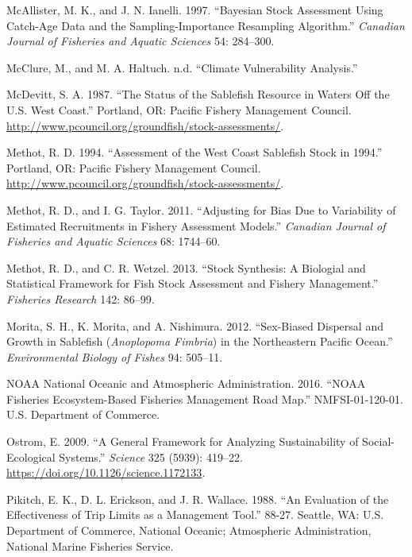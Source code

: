 \documentclass[11pt,
  english,
  a4paper,
]{article}
\newlength{\cslhangindent}
\newenvironment{cslreferences}%
  {\setlength{\parindent}{0pt}%
  \everypar{\setlength{\hangindent}{\cslhangindent}}\ignorespaces}%
  {\par}
\begin{document}
\begin{cslreferences}
\leavevmode\hypertarget{ref-McAllisterIanelli1997}{}%
McAllister, M. K., and J. N. Ianelli. 1997. ``Bayesian Stock Assessment Using Catch-Age Data and the Sampling-Importance Resampling Algorithm.'' \emph{Canadian Journal of Fisheries and Aquatic Sciences} 54: 284--300.

\leavevmode\hypertarget{ref-mcclure2020}{}%
McClure, M., and M. A. Haltuch. n.d. ``Climate Vulnerability Analysis.''

\leavevmode\hypertarget{ref-mcdevitt1987sablefish}{}%
McDevitt, S. A. 1987. ``The Status of the Sablefish Resource in Waters Off the U.S. West Coast.'' Portland, OR: Pacific Fishery Management Council. \url{http://www.pcouncil.org/groundfish/stock-assessments/}.

\leavevmode\hypertarget{ref-methot1994}{}%
Methot, R. D. 1994. ``Assessment of the West Coast Sablefish Stock in 1994.'' Portland, OR: Pacific Fishery Management Council. \url{http://www.pcouncil.org/groundfish/stock-assessments/}.

\leavevmode\hypertarget{ref-MethotTaylor2011}{}%
Methot, R. D., and I. G. Taylor. 2011. ``Adjusting for Bias Due to Variability of Estimated Recruitments in Fishery Assessment Models.'' \emph{Canadian Journal of Fisheries and Aquatic Sciences} 68: 1744--60.

\leavevmode\hypertarget{ref-MethotWetzel2013}{}%
Methot, R. D., and C. R. Wetzel. 2013. ``Stock Synthesis: A Biologial and Statistical Framework for Fish Stock Assessment and Fishery Management.'' \emph{Fisheries Research} 142: 86--99.

\leavevmode\hypertarget{ref-morita2012envbiofishsex}{}%
Morita, S. H., K. Morita, and A. Nishimura. 2012. ``Sex-Biased Dispersal and Growth in Sablefish (\emph{Anoplopoma Fimbria}) in the Northeastern Pacific Ocean.'' \emph{Environmental Biology of Fishes} 94: 505--11.

\leavevmode\hypertarget{ref-noaa2016}{}%
NOAA National Oceanic and Atmospheric Administration. 2016. ``NOAA Fisheries Ecosystem-Based Fisheries Management Road Map.'' NMFSI-01-120-01. U.S. Department of Commerce.

\leavevmode\hypertarget{ref-ostrom2009}{}%
Ostrom, E. 2009. ``A General Framework for Analyzing Sustainability of Social-Ecological Systems.'' \emph{Science} 325 (5939): 419--22. \url{https://doi.org/10.1126/science.1172133}.

\leavevmode\hypertarget{ref-pikitch1988usdoc}{}%
Pikitch, E. K., D. L. Erickson, and J. R. Wallace. 1988. ``An Evaluation of the Effectiveness of Trip Limits as a Management Tool.'' 88-27. Seattle, WA: U.S. Department of Commerce, National Oceanic; Atmospheric Administration, National Marine Fisheries Service.


\end{cslreferences}
\end{document}
